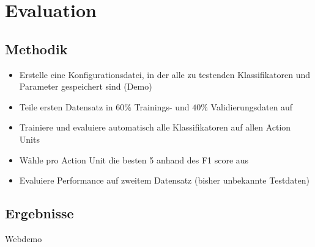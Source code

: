 \documentclass{beamer}
\begin{document}
\section{Evaluation}
\subsection{Methodik}
\begin{frame}
  \begin{itemize}
  \item Erstelle eine Konfigurationsdatei, in der alle zu testenden
    Klassifikatoren und Parameter gespeichert sind (Demo)
  \item Teile ersten Datensatz in $60\%$ Trainings- und $40\%$ Validierungsdaten auf
    \item Trainiere und evaluiere automatisch alle Klassifikatoren auf allen
      Action Units
    \item Wähle pro Action Unit die besten 5 anhand des F1 score aus
    \item Evaluiere Performance auf zweitem Datensatz (bisher unbekannte Testdaten)
  \end{itemize}
\end{frame}

\subsection{Ergebnisse}
\begin{frame}[c]
  \begin{center}
    \Huge Webdemo
  \end{center}
\end{frame}

\end{document}
